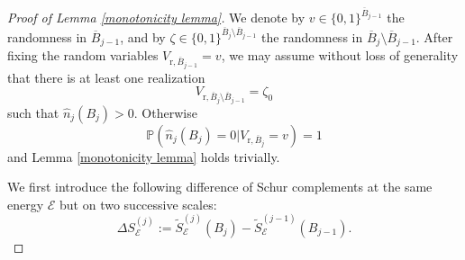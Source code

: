 \documentclass[11pt,reqno,UTF8,twoside]{amsart}
\renewcommand{\P}{\mathbb{P}}
\newcommand{\mcE}{\mathcal{E}}
\newcommand{\whn}{\widehat{n}}
\newcommand{\barB}{\overline{B}}
\newcommand{\wtSj}{\widetilde{S}^{(j)}}
\newcommand{\wtSjminusone}{\widetilde{S}^{(j-1)}}
\newcommand{\diffSj}{\Delta {S}^{(j)}}
\theoremstyle{definition}
\numberwithin{equation}{section}
\begin{document}
\begin{proof}[Proof of Lemma \ref{monotonicity lemma}]
  We denote by $v\in \{0,1\}^{\barB_{j-1}}$ the randomness in $\barB_{j-1}$, and by $\zeta\in \{0,1\}^{\barB_j\setminus\barB_{j-1}}$ the randomness in $\barB_j\setminus \barB_{j-1}$. After fixing the random variables $V_{\text{r},\barB_{j-1}}=v$, we may assume without loss of generality that there is at least one realization 
  \[V_{\text{r},\barB_j\setminus \barB_{j-1}}=\zeta_0\]
  such that $\whn_{j}(B_j)> 0$. Otherwise 
  \[\P\left(\whn_j(B_j)=0 \big| V_{\text{r},\barB_j}=v \right)=1 \]
  and Lemma \ref{monotonicity lemma} holds trivially. 



We first introduce the following difference of Schur complements at the same energy $\mcE$ but on two successive scales:  
\begin{equation}\label{difference in scales}
    \diffSj_\mcE := \wtSj_\mcE(B_j)-\wtSjminusone_\mcE(B_{j-1}).
\end{equation}


\end{proof}
\end{document}
